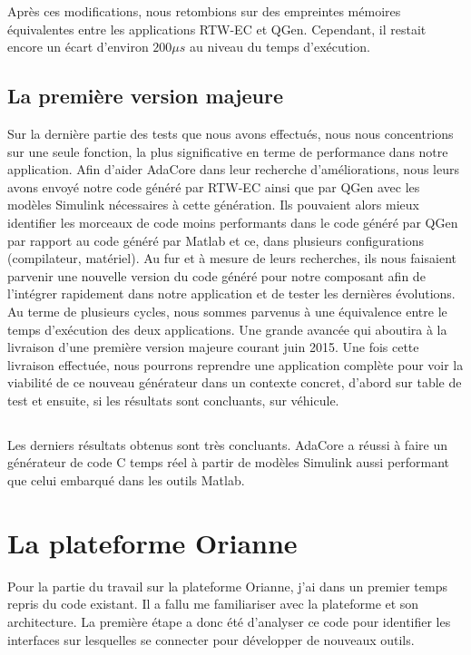 Après ces modifications, nous retombions sur des empreintes mémoires
équivalentes entre les applications RTW-EC\up{\circledR} et QGen.  Cependant, il
restait encore un écart d'environ $200\mu{}s$ au niveau du temps d'exécution.

\subsection{La première version majeure}
Sur la dernière partie des tests que nous avons effectués, nous nous concentrions
sur une seule fonction, la plus significative en terme de performance dans notre
application. Afin d'aider AdaCore dans leur recherche d'améliorations, nous
leurs avons envoyé notre code généré par RTW-EC\up{\circledR} ainsi que par QGen avec
les modèles Simulink\up{\circledR} nécessaires à cette génération. Ils pouvaient
alors mieux identifier les morceaux de code moins performants dans le code
généré par QGen par rapport au code généré par Matlab et ce, dans plusieurs
configurations (compilateur, matériel).
Au fur et à mesure de leurs recherches, ils nous faisaient parvenir une nouvelle
version du code généré pour notre composant afin de l'intégrer rapidement dans
notre application et de tester les dernières évolutions. Au terme de plusieurs
cycles, nous sommes parvenus à une équivalence entre le temps d'exécution des
deux applications. Une grande avancée qui aboutira à la livraison d'une première
version majeure courant juin 2015. Une fois cette livraison effectuée, nous
pourrons reprendre une application complète pour voir la viabilité de ce nouveau
générateur dans un contexte concret, d'abord sur table de test et ensuite, si
les résultats sont concluants, sur véhicule.

\subsection*{}
Les derniers résultats obtenus sont très concluants. AdaCore a réussi à
faire un générateur de code C temps réel à partir de modèles Simulink\up{\circledR} aussi
performant que celui embarqué dans les outils Matlab\up{\circledR}.

\section{La plateforme Orianne}
Pour la partie du travail sur la plateforme Orianne, j'ai dans un premier temps
repris du code existant. Il a fallu me familiariser avec la plateforme et son
architecture. La première étape a donc été d'analyser ce code pour identifier
les interfaces sur lesquelles se connecter pour développer de nouveaux outils.

